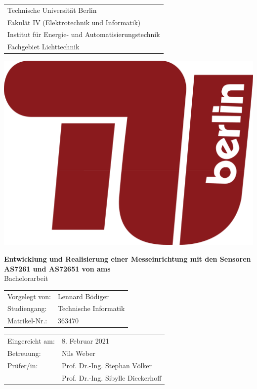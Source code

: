 \documentclass[a4paper,oneside,12pt,titlepage]{scrartcl}   %
\begin{document}

\begin{titlepage}
\begin{center}
	\begin{minipage}{0.6\textwidth}
	\begin{tabular}{l}
	Technische Universität Berlin\\
	Fakulät IV (Elektrotechnik und Informatik)\\
	Institut für Energie- und Automatisierungstechnik\\
	Fachgebiet Lichttechnik\\
	\end{tabular}
	\end{minipage}
	\hfill
	\begin{minipage}{0.3\textwidth}\raggedright
	\includegraphics[scale=0.06]{tu-logo}\\
	\end{minipage}
	
	\vspace{3cm}
    \sffamily \LARGE \textbf{Entwicklung und Realisierung einer Messeinrichtung mit den Sensoren AS7261 und AS72651 von ams}\\
 	\Large Bachelorarbeit\\
    \vspace{2.5cm}
	{\renewcommand{\arraystretch}{0.7}
    	\begin{tabular}{ll}
    		Vorgelegt von: & Lennard Bödiger\\
			Studiengang:	 & Technische Informatik\\
			Matrikel-Nr.: & 363470\\
		\end{tabular}
	}

  	\vspace{5.3cm}
	\end{center}
	\begin{tabular}{ll}
		Eingereicht am: & 8. Februar 2021\\
		Betreuung: & Nils Weber\\
		Prüfer/in: & Prof. Dr.-Ing. Stephan Völker \\ 	&Prof. Dr.-Ing. Sibylle Dieckerhoff
	\end{tabular}\\
\end{titlepage}
\end{document}

